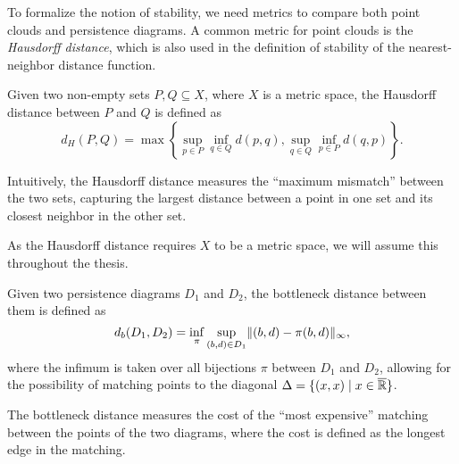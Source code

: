 To formalize the notion of stability, we need metrics to compare both point
clouds and persistence diagrams. A common metric for point clouds is the
\emph{Hausdorff distance}, which is also used in the definition of stability of
the nearest-neighbor distance function.
\begin{definition}
    Given two non-empty sets $P, Q \subseteq X$, where $X$ is a metric space,
    the Hausdorff distance between $P$ and $Q$ is defined as
    \begin{equation}
        d_H(P, Q) = \max\left\{ \sup_{p \in P} \inf_{q \in Q} d(p, q), \sup_{q \in Q} \inf_{p \in P} d(q, p) \right\}.
    \end{equation}
\end{definition}
Intuitively, the Hausdorff distance measures the ``maximum mismatch'' between the two
sets, capturing the largest distance between a point in one set and its closest
neighbor in the other set.

As the Hausdorff distance requires $X$ to be a metric space, we will assume this
throughout the thesis.

\begin{definition}
    Given two persistence diagrams $D_1$ and $D_2$, the bottleneck distance
    between them is defined as
    \begin{equation}
        d_b(D_1, D_2) = \inf_\pi \sup_{(b, d) \in D_1} \lVert(b, d) - \pi(b, d)\rVert_\infty,
    \end{equation}
    where the infimum is taken over all bijections $\pi$ between $D_1$ and
    $D_2$, allowing for the possibility of matching points to the diagonal $\Delta = \{(x, x) \mid x \in \overline{\mathbb{R}}\}$.
\end{definition}
The bottleneck distance measures the cost of the ``most expensive'' matching
between the points of the two diagrams, where the cost is defined as the longest
edge in the matching.



